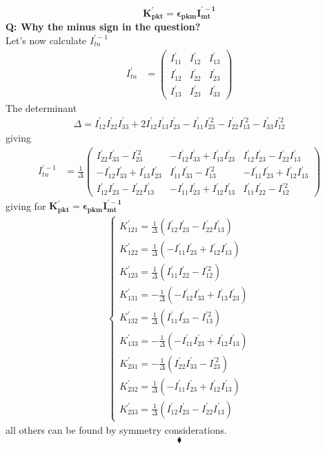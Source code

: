  $$\mathbf{K^{'}_{pkt}=\epsilon_{pkm}I^{'-1}_{mt}}$$
\textbf{Q: Why the minus sign in the question?\\}
Let's now calculate $I^{'-1}_{tn}$
\begin{align}
I^{'}_{tn} &= \left(\begin{matrix}
I^{'}_{11}&I^{'}_{12}&I^{'}_{13}\\
I^{'}_{12}&I^{'}_{22}&I^{'}_{23}\\
I^{'}_{13}&I^{'}_{23}&I^{'}_{33}
\end{matrix}\right)
\end{align}
The determinant
\begin{align}
\Delta= I^{'}_{12}I^{'}_{22}I^{'}_{33}+2I^{'}_{12}I^{'}_{13}I^{'}_{23}-I^{'}_{11}I^{'2}_{23}-I^{'}_{22}I^{'2}_{13}-I^{'}_{33}I^{'2}_{12}
\end{align}
giving
\begin{align}
I^{'-1}_{tn} &= \frac{1}{\Delta}\left(\begin{matrix}
I^{'}_{22}I^{'}_{33}-I^{'2}_{23}&-I^{'}_{12}I^{'}_{33}+I^{'}_{13}I^{'}_{23}&I^{'}_{12}I^{'}_{23}-I^{'}_{22}I^{'}_{13}\\
-I^{'}_{12}I^{'}_{33}+I^{'}_{13}I^{'}_{23}&I^{'}_{11}I^{'}_{33}-I^{'2}_{13}&-I^{'}_{11}I^{'}_{23}+I^{'}_{12}I^{'}_{13}\\
I^{'}_{12}I^{'}_{23}-I^{'}_{22}I^{'}_{13}&-I^{'}_{11}I^{'}_{23}+I^{'}_{12}I^{'}_{13}&I^{'}_{11}I^{'}_{22}-I^{'2}_{12}
\end{matrix}\right)
\end{align}
giving for $\mathbf{K^{'}_{pkt}=\epsilon_{pkm}I^{'-1}_{mt}}$
\begin{align}
\left\{\begin{array}{l}
K^{'}_{121} = \frac{1}{\Delta}\left(I^{'}_{12}I^{'}_{23}-I^{'}_{22}I^{'}_{13} \right)\\
K^{'}_{122} = \frac{1}{\Delta}\left(-I^{'}_{11}I^{'}_{23}+I^{'}_{12}I^{'}_{13}\right)\\
K^{'}_{123} = \frac{1}{\Delta}\left(I^{'}_{11}I^{'}_{22}-I^{'2}_{12}\right)\\
K^{'}_{131} = -\frac{1}{\Delta}\left(-I^{'}_{12}I^{'}_{33}+I^{'}_{13}I^{'}_{23} \right)\\
K^{'}_{132} = \frac{1}{\Delta}\left(I^{'}_{11}I^{'}_{33}-I^{'2}_{13} \right)\\
K^{'}_{133} = -\frac{1}{\Delta}\left(-I^{'}_{11}I^{'}_{23}+I^{'}_{12}I^{'}_{13}\right)\\
K^{'}_{231} = -\frac{1}{\Delta}\left(I^{'}_{22}I^{'}_{33}-I^{'2}_{23}\right)\\
K^{'}_{232} = \frac{1}{\Delta}\left(-I^{'}_{11}I^{'}_{23}+I^{'}_{12}I^{'}_{13} \right)\\
K^{'}_{233} = \frac{1}{\Delta}\left(I^{'}_{12}I^{'}_{23}-I^{'}_{22}I^{'}_{13}\right)
\end{array}\right.
\end{align}
all others can be found by symmetry considerations.
$$\blacklozenge$$
\newpage


